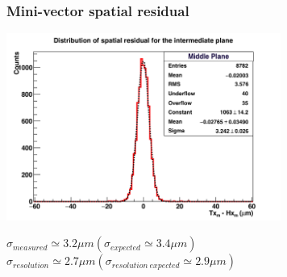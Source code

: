 \documentclass{beamer}
\begin{document}
\begin{frame}[plain]
    \frametitle{Mini-vector spatial residual}

    \vspace{-0.2cm}
    \begin{center}
        \includegraphics[width = 9cm]{Pictures/hDiffPosX_226056.png}
        
        $\sigma_{measured} \simeq 3.2 \mu m (\sigma_{expected} \simeq 3.4 \mu m)$
        $\sigma_{resolution} \simeq 2.7 \mu m (\sigma_{resolution \ expected} \simeq 2.9 \mu m)$ 
    \end{center}

\end{frame}
\end{document}

